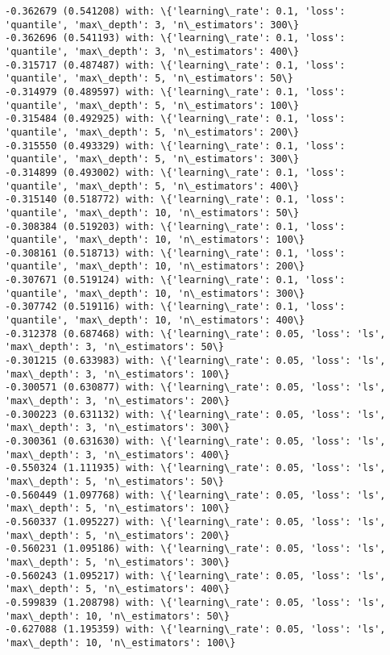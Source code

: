 \documentclass[11pt]{article}
\begin{document}
\begin{Verbatim}[commandchars=\\\{\}]
-0.362679 (0.541208) with: \{'learning\_rate': 0.1, 'loss': 'quantile', 'max\_depth': 3, 'n\_estimators': 300\}
-0.362696 (0.541193) with: \{'learning\_rate': 0.1, 'loss': 'quantile', 'max\_depth': 3, 'n\_estimators': 400\}
-0.315717 (0.487487) with: \{'learning\_rate': 0.1, 'loss': 'quantile', 'max\_depth': 5, 'n\_estimators': 50\}
-0.314979 (0.489597) with: \{'learning\_rate': 0.1, 'loss': 'quantile', 'max\_depth': 5, 'n\_estimators': 100\}
-0.315484 (0.492925) with: \{'learning\_rate': 0.1, 'loss': 'quantile', 'max\_depth': 5, 'n\_estimators': 200\}
-0.315550 (0.493329) with: \{'learning\_rate': 0.1, 'loss': 'quantile', 'max\_depth': 5, 'n\_estimators': 300\}
-0.314899 (0.493002) with: \{'learning\_rate': 0.1, 'loss': 'quantile', 'max\_depth': 5, 'n\_estimators': 400\}
-0.315140 (0.518772) with: \{'learning\_rate': 0.1, 'loss': 'quantile', 'max\_depth': 10, 'n\_estimators': 50\}
-0.308384 (0.519203) with: \{'learning\_rate': 0.1, 'loss': 'quantile', 'max\_depth': 10, 'n\_estimators': 100\}
-0.308161 (0.518713) with: \{'learning\_rate': 0.1, 'loss': 'quantile', 'max\_depth': 10, 'n\_estimators': 200\}
-0.307671 (0.519124) with: \{'learning\_rate': 0.1, 'loss': 'quantile', 'max\_depth': 10, 'n\_estimators': 300\}
-0.307742 (0.519116) with: \{'learning\_rate': 0.1, 'loss': 'quantile', 'max\_depth': 10, 'n\_estimators': 400\}
-0.312378 (0.687468) with: \{'learning\_rate': 0.05, 'loss': 'ls', 'max\_depth': 3, 'n\_estimators': 50\}
-0.301215 (0.633983) with: \{'learning\_rate': 0.05, 'loss': 'ls', 'max\_depth': 3, 'n\_estimators': 100\}
-0.300571 (0.630877) with: \{'learning\_rate': 0.05, 'loss': 'ls', 'max\_depth': 3, 'n\_estimators': 200\}
-0.300223 (0.631132) with: \{'learning\_rate': 0.05, 'loss': 'ls', 'max\_depth': 3, 'n\_estimators': 300\}
-0.300361 (0.631630) with: \{'learning\_rate': 0.05, 'loss': 'ls', 'max\_depth': 3, 'n\_estimators': 400\}
-0.550324 (1.111935) with: \{'learning\_rate': 0.05, 'loss': 'ls', 'max\_depth': 5, 'n\_estimators': 50\}
-0.560449 (1.097768) with: \{'learning\_rate': 0.05, 'loss': 'ls', 'max\_depth': 5, 'n\_estimators': 100\}
-0.560337 (1.095227) with: \{'learning\_rate': 0.05, 'loss': 'ls', 'max\_depth': 5, 'n\_estimators': 200\}
-0.560231 (1.095186) with: \{'learning\_rate': 0.05, 'loss': 'ls', 'max\_depth': 5, 'n\_estimators': 300\}
-0.560243 (1.095217) with: \{'learning\_rate': 0.05, 'loss': 'ls', 'max\_depth': 5, 'n\_estimators': 400\}
-0.599839 (1.208798) with: \{'learning\_rate': 0.05, 'loss': 'ls', 'max\_depth': 10, 'n\_estimators': 50\}
-0.627088 (1.195359) with: \{'learning\_rate': 0.05, 'loss': 'ls', 'max\_depth': 10, 'n\_estimators': 100\}

\end{Verbatim}
\end{document}
